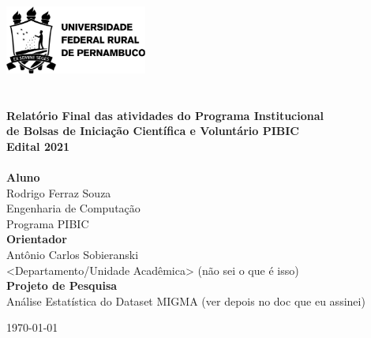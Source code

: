 \begin{titlepage}
    \begin{center}

        \includegraphics[width=0.35\textwidth]{images/ufrpe_logo_preto.png}~
        \\[2cm]

        \textsc{}
        \\[2cm]

        \HRule \\[0.4cm]
        {\large \bfseries Relatório Final das atividades do Programa Institucional \\
        de Bolsas de Iniciação Científica e Voluntário PIBIC \\
        Edital 2021\\[0.4cm]}
        \HRule
        \\[2cm]

        \large\textbf{Aluno}\\
        Rodrigo Ferraz Souza\\
        Engenharia de Computação \\
        Programa PIBIC
        \\[1cm]

        \large\textbf{Orientador}\\
        Antônio Carlos Sobieranski\\
        <Departamento/Unidade Acadêmica> (não sei o que é isso)
        \\[1cm]

        \large\textbf{Projeto de Pesquisa}\\
        Análise Estatística do Dataset MIGMA (ver depois no doc que eu assinei)\\[1cm]


        \vfill

        {\large \today}

    \end{center}
\end{titlepage}